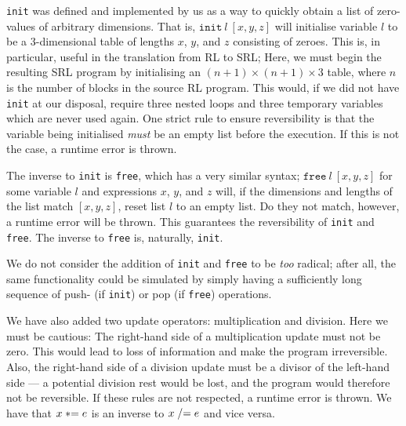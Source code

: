 \texttt{init} was defined and implemented by us as a way to quickly obtain a list of zero-values of arbitrary dimensions. That is, $\texttt{init} \ l \ [x,y,z]$ will initialise variable $l$ to be a 3-dimensional table of lengths $x$, $y$, and $z$ consisting of zeroes. This is, in particular, useful in the translation from RL to SRL; Here, we must begin the resulting SRL program by initialising an $(n+1) \times (n+1) \times 3$ table, where $n$ is the number of blocks in the source RL program. This would, if we did not have \texttt{init} at our disposal, require three nested loops and three temporary variables which are never used again. One strict rule to ensure reversibility is that the variable being initialised \textit{must} be an empty list before the execution. If this is not the case, a runtime error is thrown.

The inverse to \texttt{init} is \texttt{free}, which has a very similar syntax; $\texttt{free} \ l \ [x,y,z]$ for some variable $l$ and expressions $x$, $y$, and $z$ will, if the dimensions and lengths of the list match $[x,y,z]$, reset list $l$ to an empty list. Do they not match, however, a runtime error will be thrown. This guarantees the reversibility of \texttt{init} and \texttt{free}. The inverse to \texttt{free} is, naturally, \texttt{init}.

We do not consider the addition of \texttt{init} and \texttt{free} to be \textit{too} radical; after all, the same functionality could be simulated by simply having a sufficiently long sequence of push- (if \texttt{init}) or pop (if \texttt{free}) operations.

We have also added two update operators: multiplication and division. Here we must be cautious: The right-hand side of a multiplication update must not be zero. This would lead to loss of information and make the program irreversible. Also, the right-hand side of a division update must be a divisor of the left-hand side --- a potential division rest would be lost, and the program would therefore not be reversible. If these rules are not respected, a runtime error is thrown. We have that $x \mathrel{*}= e$ is an inverse to $x \mathrel{/}= e$ and vice versa.

